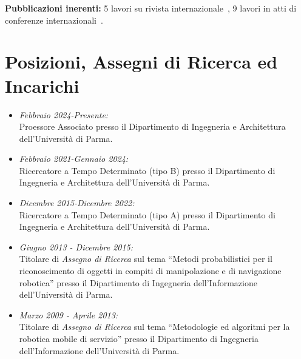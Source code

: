 \documentclass[11pt]{article}
\newcommand{\ITEMDATE}[1]{\item \textit{#1:}\\}
\begin{document}
\begin{itemize}


\textbf{Pubblicazioni inerenti:}
5 lavori su rivista internazionale~\cite{saccuti2025data, penzotti2023compag, galasso2019rcim, kallasi2017ras, cigolini2014jamris},
9 lavori in atti di conferenze internazionali~\cite{saccuti2025irc, panicieri2025iccp, monica2024etfa, lodirizzini2022raad, amoretti2020smartsys, valeriani2013acra, lodirizzini2012icinco, calo2012icinco, argenti2010isr, lodirizzini2021simai, cerri2007ccmvs}.



\section*{Posizioni, Assegni di Ricerca ed Incarichi}

\begin{itemize}
\ITEMDATE{Febbraio 2024-Presente} 
Proessore Associato presso il Dipartimento di Ingegneria e Architettura dell'Universit\`a di Parma.

\ITEMDATE{Febbraio 2021-Gennaio 2024} 
Ricercatore a Tempo Determinato (tipo B) presso il Dipartimento di Ingegneria e Architettura dell'Universit\`a di Parma.

\ITEMDATE{Dicembre 2015-Dicembre 2022} 
Ricercatore a Tempo Determinato (tipo A) presso il Dipartimento di Ingegneria e Architettura dell'Universit\`a di Parma.

\ITEMDATE{Giugno 2013 - Dicembre 2015} 
Titolare di \emph{Assegno di Ricerca} sul tema 
``Metodi probabilistici per il riconoscimento di oggetti in compiti di manipolazione e di navigazione robotica''
presso il Dipartimento di Ingegneria dell'Informazione dell'Universit\`a di Parma.

\ITEMDATE{Marzo 2009 - Aprile 2013} 
Titolare di \emph{Assegno di Ricerca} sul tema ``Metodologie ed algoritmi per la robotica mobile di servizio''
presso il Dipartimento di Ingegneria dell'Informazione dell'Universit\`a di Parma.


\end{itemize}
\end{itemize}
\end{document}
